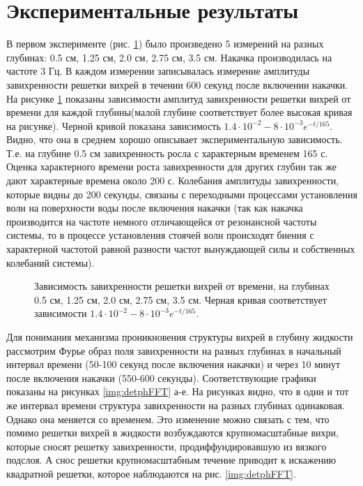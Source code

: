 \section{Экспериментальные результаты} \label{sect6_3}

В первом эксперименте (рис. \ref{img:5deeps}) было произведено 5 измерений на разных глубинах: 0.5 см, 1.25 см, 2.0 см, 2.75 см, 3.5 см. Накачка производилась на частоте 3 Гц. В каждом измерении записывалась измерение амплитуды завихренности решетки вихрей в течении 600 секунд после включении накачки. На рисунке \ref{img:5deeps} показаны зависимости амплитуд завихренности решетки вихрей от времени для каждой глубины(малой глубине соответствует более высокая кривая на рисунке). Черной кривой показана зависимость $1.4 \cdot 10^{-2} - 8 \cdot 10^{-3} e^{-t/165}$. Видно, что она в среднем хорошо описывает экспериментальную зависимость. Т.е. на глубине 0.5 см завихренность росла с характерным временем 165 с. Оценка характерного времени роста завихренности для других глубин так же дают характерные времена около 200 с. Колебания амплитуды завихренности, которые видны до 200 секунды, связаны с переходными процессами установления волн на поверхности воды после включения накачки (так как накачка производится на частоте немного отличающейся от резонансной частоты системы, то в процессе установления стоячей волн происходят биения с характерной частотой равной разности частот вынуждающей силы и собственных колебаний системы).

\begin{figure}[ht]
  \caption{Зависимость завихренности решетки вихрей от времени, на глубинах 0.5 см, 1.25 см, 2.0 см, 2.75 см, 3.5 см. Черная кривая соответствует зависимости $1.4 \cdot 10^{-2} - 8 \cdot 10^{-3} e^{-t/165}$.}
  \label{img:5deeps}  
\end{figure}


Для понимания механизма проникновения структуры вихрей в глубину жидкости рассмотрим Фурье образ поля завихренности на разных глубинах в начальный интервал времени (50-100 секунд после включения накачки) и через 10 минут после включения накачки (550-600 секунды). Соответствующие графики показаны на рисунках \ref{img:detphFFT} а-е. На рисунках видно, что в один и тот же интервал времени структура завихренности на разных глубинах одинаковая. Однако она меняется со временем. Это изменение можно связать с тем, что помимо решетки вихрей в жидкости возбуждаются крупномасштабные вихри, которые сносят  решетку завихренности, продиффундировавшую из вязкого подслоя. А снос решетки крупномасштабным течение приводит к искажению квадратной решетки, которое наблюдаются на рис. \ref{img:detphFFT}.

